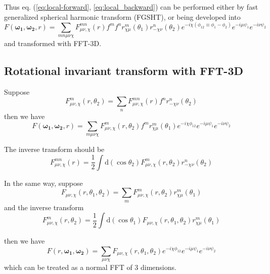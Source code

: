 Thus eq. (\ref{eq:local-forward}, \ref{eq:local_backward}) can be
performed either by fast generalized spherical harmonic transform
(FGSHT), or being developed into
\begin{equation}
F(\boldsymbol{\omega_{1}},\boldsymbol{\omega_{2}},r)=\sum_{mn\mu\nu\chi}F_{\mu\nu,\chi}^{mn}(r)f^{m}f^{n}r_{\chi\mu}^{m}(\theta_{1})r_{-\chi\nu}^{n}(\theta_{2})e^{-i\chi(\phi_{12}\equiv\phi_{1}-\phi_{2})}e^{-i\mu\psi_{1}}e^{-i\nu\psi_{2}}\label{eq:eq_s1_local}
\end{equation}
and transformed with FFT-3D.


\subsection{Rotational invariant transform with FFT-3D}

Suppose
\begin{equation}
F_{\mu\nu,\chi}^{m}(r,\theta_{2})=\sum_{n}F_{\mu\nu,\chi}^{mn}(r)f^{n}r_{-\chi\nu}^{n}(\theta_{2})
\end{equation}
then we have
\begin{equation}
F(\boldsymbol{\omega_{1}},\boldsymbol{\omega_{2}},r)=\sum_{m\mu\nu\chi}F_{\mu\nu,\chi}^{m}(r,\theta_{2})f^{m}r_{\chi\mu}^{m}(\theta_{1})e^{-i\chi\phi_{12}}e^{-i\mu\psi_{1}}e^{-i\nu\psi_{2}}
\end{equation}


The inverse transform should be
\begin{equation}
F_{\mu\nu,\chi}^{mn}(r)=\frac{1}{2}\int\mathrm{d}(\cos\theta_{2})F_{\mu\nu,\chi}^{m}(r,\theta_{2})r_{-\chi\nu}^{n}(\theta_{2})
\end{equation}


In the same way, suppose
\begin{equation}
F_{\mu\nu,\chi}(r,\theta_{1},\theta_{2})=\sum_{m}F_{\mu\nu,\chi}^{m}(r,\theta_{2})r_{\chi\mu}^{m}(\theta_{1})
\end{equation}
and the inverse transform
\begin{equation}
F_{\mu\nu,\chi}^{m}(r,\theta_{2})=\frac{1}{2}\int\mathrm{d}(\cos\theta_{1})F_{\mu\nu,\chi}(r,\theta_{1},\theta_{2})r_{\chi\mu}^{m}(\theta_{1})
\end{equation}


then we have
\begin{equation}
F(r,\boldsymbol{\omega_{1}},\boldsymbol{\omega_{2}})=\sum_{\mu\nu\chi}F_{\mu\nu,\chi}(r,\theta_{1},\theta_{2})e^{-i\chi\phi_{12}}e^{-i\mu\psi_{1}}e^{-i\nu\psi_{2}}\label{eq:eq_s3_local}
\end{equation}
which can be treated as a normal FFT of 3 dimensions.


